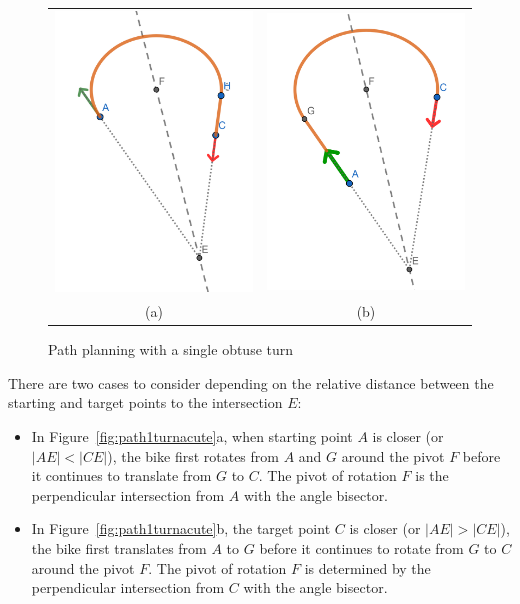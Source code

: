 \documentclass{article}
\begin{document}
\begin{figure}[h]
  \begin{tabular}{cc}
    \includegraphics[width=6cm]{screenshots/single-obtuse-turn-rot-trans.png} & 
    \includegraphics[width=6cm]{screenshots/single-obtuse-turn-trans-rot.png}       \\
    (a)                                                                       & (b) \\
  \end{tabular}
  \caption{Path planning with a single obtuse turn}
  \label{fig:path1turnobtuse}
\end{figure}


There are two cases to consider depending on the relative distance between 
the starting and target points to the intersection $E$:
\begin{itemize}
  \item In Figure~\ref{fig:path1turnacute}a, when starting point $A$ is closer 
  (or $|AE| < |CE|$), the bike first rotates from $A$ and $G$ around the
        pivot $F$  before it continues to translate from $G$ to $C$. The pivot of rotation $F$ is the perpendicular
        intersection from $A$ with the angle bisector.
  \item In Figure~\ref{fig:path1turnacute}b, the target point $C$ is closer (or $|AE| > |CE|$), 
  the bike first translates from $A$ to $G$ before it
        continues to rotate from $G$ to $C$ around the pivot $F$. The pivot of rotation $F$ is determined
        by the perpendicular intersection from $C$ with the angle bisector.
\end{itemize}
\end{document}
